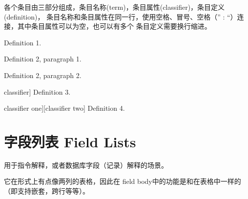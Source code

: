 \documentclass[a4paper,10pt,english]{sphinxmanual}
\begin{document}
\sphinxAtStartPar
各个条目由三部分组成，条目名称(term)，条目属性(classifier)，条目定义(definition)， 条目名称和条目属性在同一行，使用空格、冒号、空格（” : “）连接，其中条目属性可以为空，也可以有多个
条目定义需要换行缩进。

\sphinxAtStartPar
{}

\begin{sphinxVerbatim}[commandchars=\\\{\}]
 
   

 
       

       

   
     

       
     
\end{sphinxVerbatim}

\sphinxAtStartPar
{}
\begin{description}
\sphinxAtStartPar
Definition 1.

\sphinxAtStartPar
Definition 2, paragraph 1.

\sphinxAtStartPar
Definition 2, paragraph 2.

\sphinxlineitem{term 3}{[}classifier{]}
\sphinxAtStartPar
Definition 3.

\sphinxlineitem{term 4}{[}classifier one{]}{[}classifier two{]}
\sphinxAtStartPar
Definition 4.

\end{description}


\section{字段列表 Field Lists}
\label{\detokenize{reStructureText_syntax:field-lists}}
\sphinxAtStartPar
{} 用于指令解释，或者数据库字段（记录）解释的场景。

\sphinxAtStartPar
它在形式上有点像两列的表格，因此在 field body中的功能是和在表格中一样的（即支持嵌套，跨行等等）。
\end{document}
